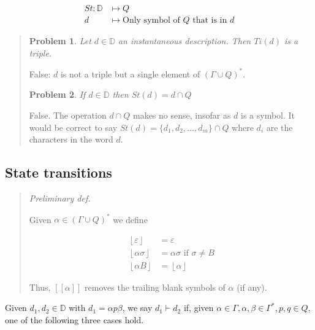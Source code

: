 \documentclass[a4paper, 12pt]{article}
\newtheorem{problem}{Problem}
\newtheorem{problem}{Problem}
\begin{document}
\begin{align*}
    St : \mathbb{D} &\mapsto  Q \\ 
    d &\mapsto \text{Only symbol of $Q$ that is in $d$}
\end{align*}


\small
\begin{quote}

\begin{problem}
    Let $d \in \mathbb{D}$ an instantaneous description. Then $Ti(d)$ is a
    triple.
\end{problem}

False: $d$ is not a triple but a single element of $(\Gamma \cup Q)^{*}$.

\begin{problem}
    If $d \in \mathbb{D}$ then $St(d) = d \cap Q$
\end{problem}

False. The operation $d \cap Q$ makes no sense, insofar as $d$ is a symbol. It
would be correct to say $St(d) = \{d_1, d_2, \ldots, d_m\} \cap Q$ where $d_i$ are
the characters in the word $d$.


\end{quote}
\normalsize

\subsection{State transitions}

\small
\begin{quote}
\textit{Preliminary def. }

Given $\alpha \in (\Gamma \cup Q)^*$ we define 

\begin{align*}
    \left\lfloor \varepsilon \right\rfloor  &= \varepsilon \\ 
    \left\lfloor \alpha \sigma  \right\rfloor  &= \alpha \sigma \text{   if } \sigma \neq B \\ 
    \left\lfloor \alpha B \right\rfloor &= \left\lfloor  \alpha \right\rfloor
\end{align*}

Thus, $[[ \alpha ]]$ removes the trailing blank symbols of $\alpha$ (if any).
\end{quote}
\normalsize 

Given $d_1, d_2 \in \mathbb{D}$ with $d_1 = \alpha p \beta $, we say $d_1 \vdash
d_2$ if, given $\alpha \in \Gamma, \alpha, \beta \in  \Gamma^*, p, q \in Q$, one
of the following three cases hold.
\end{document}
